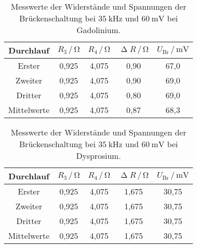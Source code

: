\begin{table}[H]
  \centering
  \caption{Messwerte der Widerstände und Spannungen der Brückenschaltung bei $\SI{35}{\kilo\hertz}$ und $\SI{60}{\milli\volt}$ bei Gadolinium.}
  \label{tab:GdMessw}
  \begin{tabular}{c| c c c c}
    \toprule
    Durchlauf & $R_3 \,/\, \si{\ohm}$ & $R_4 \,/\, \si{\ohm}$ & $\upDelta R \,/\, \si{\ohm}$ & $U_{\text{Br}} \,/\, \si{\milli\volt}$ \\
    \midrule
    Erster & 0,925 & 4,075 & 0,90 & 67,0 \\
    Zweiter & 0,925 & 4,075 & 0,90 & 69,0 \\
    Dritter & 0,925 & 4,075 & 0,80 & 69,0 \\
    Mittelwerte & 0,925 & 4,075 & 0,87 & 68,3\\
    \bottomrule
  \end{tabular}
\end{table}

\begin{table}[H]
  \centering
  \caption{Messwerte der Widerstände und Spannungen der Brückenschaltung bei $\SI{35}{\kilo\hertz}$ und $\SI{60}{\milli\volt}$ bei Dysprosium.}
  \label{tab:DyMessw}
  \begin{tabular}{c| c c c c}
    \toprule
    Durchlauf & $R_3 \,/\, \si{\ohm}$ & $R_4 \,/\, \si{\ohm}$ & $\upDelta R \,/\, \si{\ohm}$ & $U_{\text{Br}} \,/\, \si{\milli\volt}$ \\
    \midrule
    Erster & 0,925 & 4,075 & 1,675 & 30,75 \\
    Zweiter & 0,925 & 4,075 & 1,675 & 30,75 \\
    Dritter & 0,925 & 4,075 & 1,675 & 30,75 \\
    Mittelwerte & 0,925 & 4,075 & 1,675 & 30,75 \\
    \bottomrule
  \end{tabular}
\end{table}


